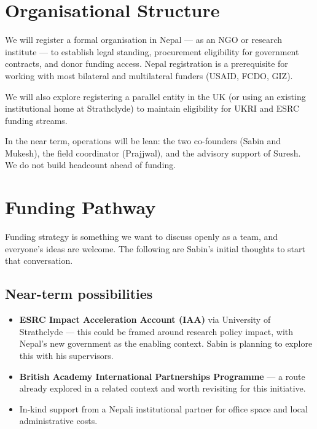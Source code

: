 \documentclass[11pt, a4paper]{article}
\begin{document}
\section{Organisational Structure}

We will register a formal organisation in Nepal --- as an NGO or research institute --- to establish legal standing, procurement eligibility for government contracts, and donor funding access. Nepal registration is a prerequisite for working with most bilateral and multilateral funders (USAID, FCDO, GIZ).

We will also explore registering a parallel entity in the UK (or using an existing institutional home at Strathclyde) to maintain eligibility for UKRI and ESRC funding streams.

In the near term, operations will be lean: the two co-founders (Sabin and Mukesh), the field coordinator (Prajjwal), and the advisory support of Suresh. We do not build headcount ahead of funding.

\section{Funding Pathway}

Funding strategy is something we want to discuss openly as a team, and everyone's ideas are welcome. The following are Sabin's initial thoughts to start that conversation.

\subsection*{Near-term possibilities}

\begin{itemize}
  \item \textbf{ESRC Impact Acceleration Account (IAA)} via University of Strathclyde --- this could be framed around research policy impact, with Nepal's new government as the enabling context. Sabin is planning to explore this with his supervisors.
  \item \textbf{British Academy International Partnerships Programme} --- a route already explored in a related context and worth revisiting for this initiative.
  \item In-kind support from a Nepali institutional partner for office space and local administrative costs.
\end{itemize}
\end{document}

